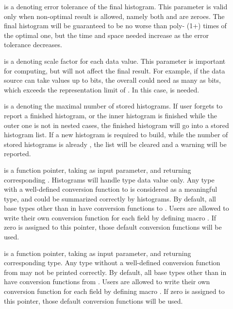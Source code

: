 \begin{description}
\item[] is a  denoting error tolerance of the
  final histogram. This parameter is valid only when non-optimal
  result is allowed, namely both  and  are
  zeroes. The final histogram will be guaranteed to be no worse than
  poly- (1+) times of the optimal one, but the time and
  space needed increase as the error tolerance decreases.  

\item[] is a  denoting scale factor for
  each data value. This parameter is important for computing, but will
  not affect the final result. For example, if the data source can
  take values up to  bits, the overall  could need
  as many as  bits, which exceeds the representation limit of
  \pads{}. In this case,  is needed. 

\item[] is a  denoting the maximal
  number of stored histograms. If user forgets to report a finished
  histogram, or the inner histogram is finished while the outer one is
  not in nested cases, the finished histogram will go into a stored
  histogram list. If a new histogram is required to build, while the
  number of stored histograms is already , the
  list will be cleared and a warning will be reported.

\item[] is a function pointer, taking
   as input parameter, and returning corresponding
  . Histograms will handle  type data value 
  only. Any type with a well-defined conversion function to
   is considered as a meaningful type, and could be summarized
  correctly by histograms. By default, all base types other than  in \pads{} have
  conversion functions to . Users are allowed to write their
  own conversion function for each field by defining macro . If zero is assigned to this pointer, those default
  conversion functions will be used.
   
\item[] is a function pointer, taking
   as input parameter, and returning corresponding
   type. Any type without a well-defined conversion
  function from  may not be printed correctly. By
  default, all base types other than  in \pads{} have
  conversion functions from . Users are allowed to write their
  own conversion function for each field by defining macro . If zero is assigned to this pointer, those default
  conversion functions will be used.

\end{description}

